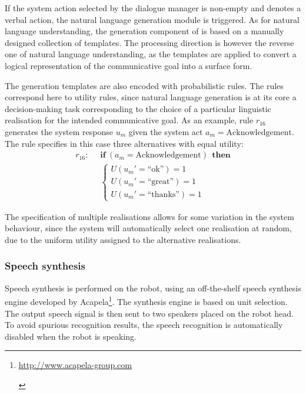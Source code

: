 If the system action selected by the dialogue manager is non-empty and denotes a verbal action, the natural language generation module is triggered.  As for natural language understanding, the generation component of \opendial is based on a manually designed collection of templates.  The processing direction is however the reverse one of  natural language understanding, as the templates are applied to convert a logical representation of the communicative goal into a surface form. 

The generation templates are also encoded with probabilistic rules.  The rules correspond here to utility rules, since natural language generation is at its core a decision-making task corresponding to the choice of a particular linguistic realisation for the intended communicative goal.  As an example, rule $r_{16}$ generates the system response $u_m$ given the system act $a_m=\mathrm{Acknowledgement}$.  The rule specifies in this case three alternatives with equal utility:
\begin{align*}
r_{16}: &\;\;\textbf{if} \ (a_m = \mathrm{Acknowledgement} )  \ \ \textbf{then} \\ 
& \;\; \begin{cases} U(u_m'=\text{``ok''}) = 1 \\ U(u_m'=\text{``great''}) = 1 \\ U(u_m'=\text{``thanks''}) = 1 \end{cases}
\end{align*}

The specification of multiple realisations allows for some variation in the system behaviour, since the system will automatically select one realisation at random, due to the uniform utility assigned to the alternative realisations.

\subsubsection*{Speech synthesis}

Speech synthesis is performed on the robot, using an off-the-shelf speech synthesis engine developed by Acapela\footnote{\begin{scriptsize}\url{http://www.acapela-group.com}\end{scriptsize}}. The synthesis engine is based on unit selection. The output speech signal is then sent to two speakers placed on the robot head. To avoid spurious recognition results, the speech recognition is automatically disabled when the robot is speaking.   
 
